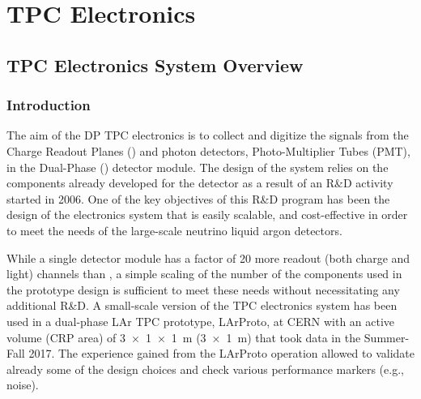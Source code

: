 \chapter{TPC Electronics}
\label{ch:fddp-tpc-elec}


\section{TPC Electronics System Overview}
\label{sec:fddp-tpc-elec-ov}

\subsection{Introduction}
\label{sec:fddp-tpc-elec-intro}

The aim of the DP TPC electronics is to collect and digitize the signals from the Charge Readout Planes () and photon detectors, Photo-Multiplier Tubes (PMT), in the Dual-Phase () detector module. The design of the system relies on the components already developed for the  detector as a result of an R\&D activity started in 2006. One of the key objectives of this R\&D program has been the design of the electronics system that is easily scalable, and cost-effective in order to meet the needs of the large-scale neutrino liquid argon detectors.  

While a single  detector module has a factor of \num{20} more readout (both charge and light) channels than , a simple scaling of the number of the components used in the prototype design is sufficient to meet these needs without necessitating any additional R\&D. A small-scale version of the TPC electronics system has been used in a dual-phase LAr TPC prototype, LArProto, at CERN with an active volume (CRP area) of \SI[product-units=power]{3x1x1}{m} (\SI[product-units=power]{3x1}{m}) that took data in the Summer-Fall 2017. The experience gained from the LArProto operation allowed to validate already some of the design choices and check various performance markers (e.g., noise). 

